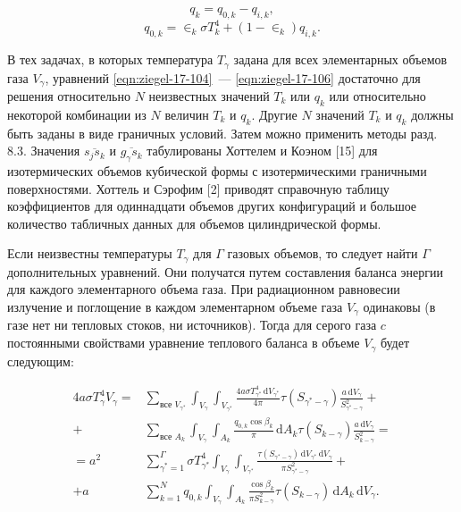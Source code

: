 \begin{equation}
	q_k = q_{0, k} - q_{i, k},
\end{equation}
\begin{equation}
	\label{eqn:ziegel-17-106}
	q_{0, k} = \in_k \! \sigma T^4_k + (1 - \in_k) q_{i, k}.
\end{equation}

В тех задачах, в которых температура $T_\gamma$ задана для всех
элементарных объемов газа $V_\gamma$, уравнений \eqref{eqn:ziegel-17-104}~— \eqref{eqn:ziegel-17-106}
достаточно для решения относительно $N$ неизвестных значений
$T_k$ или $q_k$ или относительно некоторой комбинации из $N$ величин
$T_k$ и $q_k$. Другие $N$ значений $T_k$ и $q_k$ должны быть заданы в виде
граничных условий. Затем можно применить методы разд. 8.3.
Значения $\overline{s_j s_k}$ и $\overline{g_\gamma s_k}$ табулированы Хоттелем и Коэном [15] для
изотермических объемов кубической формы с изотермическими
граничными поверхностями. Хоттель и Сэрофим [2] приводят
справочную таблицу коэффициентов для одиннадцати объемов других
конфигураций и большое количество табличных данных для
объемов цилиндрической формы.

Если неизвестны температуры $T_\gamma$ для $\Gamma$ газовых объемов,
то следует найти $\Gamma$ дополнительных уравнений. Они получатся
путем составления баланса энергии для каждого элементарного
объема газа. При радиационном равновесии излучение и
поглощение в каждом элементарном объеме газа $V_\gamma$ одинаковы (в газе
нет ни тепловых стоков, ни источников). Тогда для серого газа
$c$ постоянными свойствами уравнение теплового баланса в объеме
$V_\gamma$ будет следующим:

\begin{equation}
	\label{eqn:ziegel-17-107}
	\begin{aligned}
		4a\sigma T^4_\gamma V_\gamma = & \sum_{\text{все } V_{\gamma^*}} \int_{V_\gamma} \int_{V_{\gamma^*}} \frac{4a\sigma T^4_{\gamma^*} \, \mathrm dV_{\gamma^*}}{4\pi} \tau (S_{\gamma^*-\gamma}) \frac{a \, \mathrm dV_\gamma}{S^2_{\gamma^*-\gamma}} + \\
		+ & \sum_{\text{все } A_k} \int_{V_\gamma} \int_{A_k} \frac{q_{0, k} \cos{\beta_k}}{\pi} \, \mathrm dA_k \tau(S_{k-\gamma}) \frac {a \, \mathrm dV_\gamma}{S^2_{k-\gamma}} = \\
		= a^2 & \sum_{\gamma^* = 1}^{\Gamma} \sigma T^4_{\gamma^*} \int_{V_\gamma} \int_{V_{\gamma^*}} \frac{\tau(S_{\gamma^* - \gamma}) \, \mathrm dV_{\gamma^*} \, \mathrm dV_\gamma}{\pi S^2_{\gamma^* - \gamma}} + \\
		+ a & \sum_{k=1}^{N} q_{0, k} \int_{V_\gamma} \int_{A_k} \frac{\cos{\beta_k}}{\pi S^2_{k-\gamma}} \tau(S_{k-\gamma}) \, \mathrm dA_k \,\mathrm dV_\gamma.
	\end{aligned}
\end{equation}

